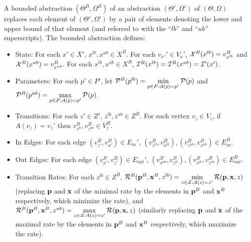 \begin{definition}
A bounded abstraction $(\Theta^B, \Omega^B)$ of an abstraction $(\Theta',
\Omega')$ of $(\Theta, \Omega)$ replaces each element of $(\Theta', \Omega')$ by
a pair of elements denoting the lower and upper bound of that element (and
referred to with the ``$lb$'' and ``$ub$'' superscripts).  The bounded
abstraction defines:
\begin{itemize}
    \item State: For each $x' \in X'$,  $x^{lb}, x^{ub} \in X^B$.  For each
    $v_{x'}' \in V_x'$, ${\cal X}^B(x^{lb}) = v_{x^{lb}}^B$ and ${\cal
    X}^B(x^{ub}) = v_{x^{ub}}^B$.   For each $x^{lb}, x^{ub} \in X^B$, ${\cal
    I}^B(x^{lb}) = {\cal I}^B(x^{ub}) = {\cal I}'(x')$.
        \item Parameters: For each $p' \in P'$, let ${\cal P}^B(p^{lb}) =
        \min\limits_{p \in P: A(p) = p'} {\cal P}(p)$ and ${\cal P}^B(p^{ub}) =
        \max\limits_{p \in P: A(p) = p'} {\cal P}(p)$. 
        

        \item Transitions: For each $z' \in Z'$, $z^{lb}, z^{ub} \in Z^B$. For
        each vertex $v_z \in V_z$, if $A(v_z)=v_z'$ then $v_{z^{lb}}^B, v_{z^{ub}}^B \in V_z^B$.
        
        \item In Edges: For each edge $(v_{z'}^B, v_{x'}^B) \in E_{in}'$,
        $(v_{z^{lb}}^B, v_{x^{lb}}^B), (v_{z^{ub}}^B, v_{x^{ub}}^B) \in E^B_{in}$.
        \item Out Edges: For each edge $(v_{x'}^B, v_{z'}^B) \in E_{out}'$,
        $(v_{x^{ub}}^B, v_{z^{lb}}^B), (v_{x^{lb}}^B, v_{z^{ub}}^B) \in E^B_{out}$.

        
        \item Transition Rates: For each $z^{lb} \in Z^B$, ${\cal R}^B({\bf
        p}^B, {\bf x}^B, z^{lb}) = \min\limits_{z \in Z: A(z)=z'} {\cal R}({\bf
        p}, {\bf x}, z)$ (replacing ${\bf p}$ and ${\bf x}$ of the minimal rate
        by the elements in ${\bf p}^B$ and ${\bf x}^B$ respectively, which
        minimize the rate), and ${\cal R}^B({\bf p}^B, {\bf x}^B, z^{ub}) =
        \max\limits_{z \in Z: A(z)=z'} {\cal R}({\bf p}, {\bf x}, z)$ (similarly
        replacing ${\bf p}$ and ${\bf x}$ of the maximal rate by the elements in
        ${\bf p}^B$ and ${\bf x}^B$ respectively, which maximize the rate).
\end{itemize}
    
\end{definition}

